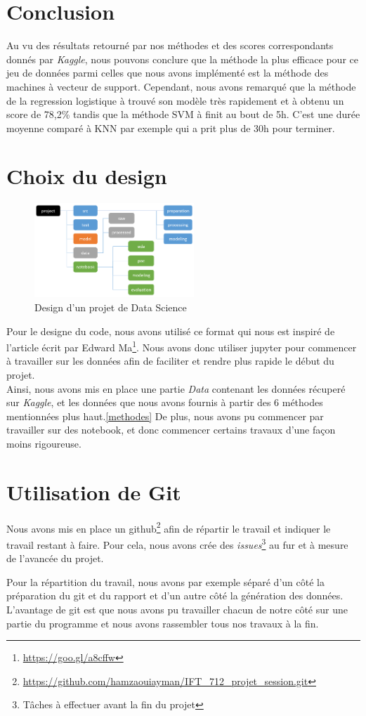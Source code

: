 \documentclass[12pt]{article}
\begin{document}
\section{Conclusion}
Au vu des résultats retourné par nos méthodes et des scores correspondants donnés par \textit{Kaggle}, nous pouvons conclure que la méthode la plus efficace pour ce jeu de données parmi celles que nous avons implémenté est la méthode des machines à vecteur de support. Cependant, nous avons remarqué que la méthode de la regression logistique à trouvé son modèle très rapidement et à obtenu un score de 78,2\% tandis que la méthode SVM à finit au bout de 5h. C'est une durée moyenne comparé à KNN par exemple qui a prit plus de 30h pour terminer.


\newpage
\appendix
\section{Choix du design}
\begin{figure}
	\includegraphics[width=6cm]{./projet_structure.png}
	\caption{Design d'un projet de Data Science}
\end{figure}
Pour le designe du code, nous avons utilisé ce format qui nous est inspiré de l'article écrit par Edward Ma\footnote{\url{https://goo.gl/a8cffw}}. Nous avons donc utiliser jupyter pour commencer à travailler sur les données afin de faciliter et rendre plus rapide le début du projet.\\ 
Ainsi, nous avons mis en place une partie \emph{Data} contenant les données récuperé sur \textit{Kaggle}, et les données que nous avons fournis à partir des 6 méthodes mentionnées plus haut.\ref{methodes} De plus, nous avons pu commencer par travailler sur des notebook, et donc commencer certains travaux d'une façon moins rigoureuse. 


\section{Utilisation de Git}
Nous avons mis en place un github\footnote{\url{https://github.com/hamzaouiayman/IFT_712_projet_session.git}} afin de répartir le travail et indiquer le travail restant à faire. Pour cela, nous avons crée des \textit{issues}\footnote{Tâches à effectuer avant la fin du projet} au fur et à mesure de l'avancée du projet. 

Pour la répartition du travail, nous avons par exemple séparé d'un côté la préparation du git et du rapport et d'un autre côté la génération des données. L'avantage de git est que nous avons pu travailler chacun de notre côté sur une partie du programme et nous avons rassembler tous nos travaux à la fin.
\end{document}
